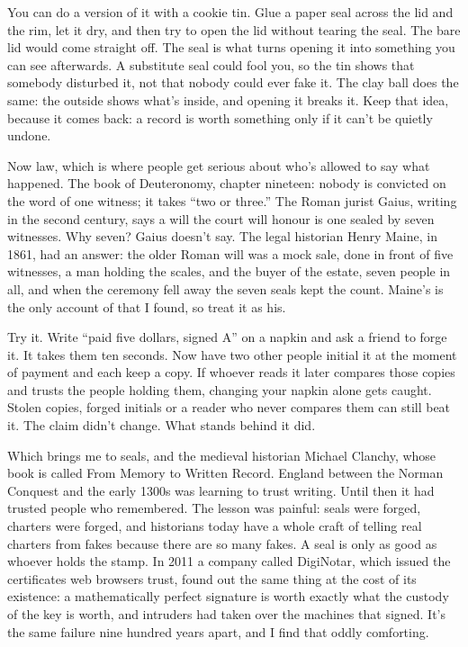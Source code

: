 \documentclass[11pt,twoside]{article}
\theoremstyle{thielethm}
\theoremstyle{thieledef}
\theoremstyle{thieledef}
\theoremstyle{thieledef}
\theoremstyle{thielethm}
\theoremstyle{thieleobs}
\theoremstyle{thielethm}
\begin{document}
You can do a version of it with a cookie tin. Glue a paper seal across the lid and the rim, let it dry, and then try to open the lid without tearing the seal. The bare lid would come straight off. The seal is what turns opening it into something you can see afterwards. A substitute seal could fool you, so the tin shows that somebody disturbed it, not that nobody could ever fake it. The clay ball does the same: the outside shows what's inside, and opening it breaks it. Keep that idea, because it comes back: a record is worth something only if it can't be quietly undone.

Now law, which is where people get serious about who's allowed to say what happened. The book of Deuteronomy, chapter nineteen: nobody is convicted on the word of one witness; it takes ``two or three.'' The Roman jurist Gaius, writing in the second century, says a will the court will honour is one sealed by seven witnesses. Why seven? Gaius doesn't say. The legal historian Henry Maine, in 1861, had an answer: the older Roman will was a mock sale, done in front of five witnesses, a man holding the scales, and the buyer of the estate, seven people in all, and when the ceremony fell away the seven seals kept the count. Maine's is the only account of that I found, so treat it as his.

Try it. Write ``paid five dollars, signed A'' on a napkin and ask a friend to forge it. It takes them ten seconds. Now have two other people initial it at the moment of payment and each keep a copy. If whoever reads it later compares those copies and trusts the people holding them, changing your napkin alone gets caught. Stolen copies, forged initials or a reader who never compares them can still beat it. The claim didn't change. What stands behind it did.

Which brings me to seals, and the medieval historian Michael Clanchy, whose book is called From Memory to Written Record. England between the Norman Conquest and the early 1300s was learning to trust writing. Until then it had trusted people who remembered. The lesson was painful: seals were forged, charters were forged, and historians today have a whole craft of telling real charters from fakes because there are so many fakes. A seal is only as good as whoever holds the stamp. In 2011 a company called DigiNotar, which issued the certificates web browsers trust, found out the same thing at the cost of its existence: a mathematically perfect signature is worth exactly what the custody of the key is worth, and intruders had taken over the machines that signed. It's the same failure nine hundred years apart, and I find that oddly comforting.
\end{document}
